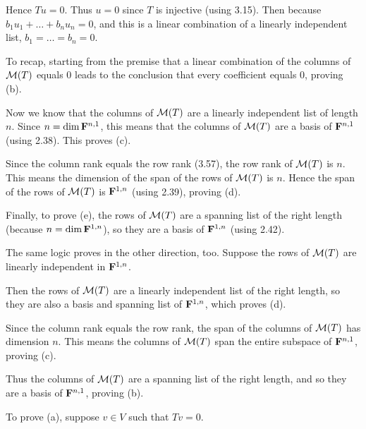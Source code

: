 \documentclass[a5paper]{article}
\begin{document}
    Hence $Tu = 0$.
    Thus $u = 0$ since $T$ is injective (using 3.15).
    Then because $b_1u_1 + \dots + b_nu_n = 0$, and this is a linear combination of a linearly independent list, $b_1=\dots=b_n=0$.

    To recap, starting from the premise that a linear combination of the columns of $\mathcal{M}(T)$ equals 0 leads to the conclusion that every coefficient equals 0, proving (b).

    Now we know that the columns of $\mathcal{M}(T)$ are a linearly independent list of length $n$.
    Since $n = \operatorname{dim} \mathbf{F}^{n,1}$, this means that the columns of $\mathcal{M}(T)$ are a basis of $\mathbf{F}^{n,1}$ (using 2.38).
    This proves (c).

    Since the column rank equals the row rank (3.57), the row rank of $\mathcal{M}(T)$ is $n$.
    This means the dimension of the span of the rows of $\mathcal{M}(T)$ is $n$.
    Hence the span of the rows of $\mathcal{M}(T)$ is $\mathbf{F}^{1,n}$ (using 2.39), proving (d).

    Finally, to prove (e), the rows of $\mathcal{M}(T)$ are a spanning list of the right length (because $n = \operatorname{dim} \mathbf{F}^{1,n}$), so they are a basis of $\mathbf{F}^{1,n}$ (using 2.42).

    The same logic proves in the other direction, too.
    Suppose the rows of $\mathcal{M}(T)$ are linearly independent in $\mathbf{F}^{1,n}$.

    Then the rows of $\mathcal{M}(T)$ are a linearly independent list of the right length, so they are also a basis and spanning list of $\mathbf{F}^{1,n}$, which proves (d).

    Since the column rank equals the row rank, the span of the columns of $\mathcal{M}(T)$ has dimension $n$.
    This means the columns of $\mathcal{M}(T)$ span the entire subspace of $\mathbf{F}^{n,1}$, proving (c).

    Thus the columns of $\mathcal{M}(T)$ are a spanning list of the right length, and so they are a basis of $\mathbf{F}^{n,1}$, proving (b).

    To prove (a), suppose $v \in V$ such that $Tv = 0$.
\end{document}
